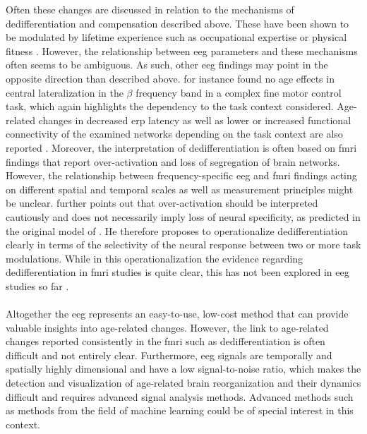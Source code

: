Often these changes are discussed in relation to the mechanisms of dedifferentiation and compensation described above. These have been shown to be modulated by lifetime experience such as occupational expertise \cite{vieluf2018age} or physical fitness \cite{Douw2014}. However, the relationship between \gls{eeg} parameters and these mechanisms often seems to be ambiguous. As such, other \gls{eeg} findings may point in the opposite direction than described above. \citeauthor{HUBNER2018104} \cite{HUBNER2018104} for instance found no age effects in central lateralization in the $\beta$ frequency band in a complex fine motor control task, which again highlights the dependency to the task context considered. Age-related changes in decreased \gls{erp} latency as well as lower or increased functional connectivity of the examined networks depending on the task context are also reported \cite{Courtney2021}. Moreover, the interpretation of dedifferentiation is often based on \gls{fmri} findings that report over-activation and loss of segregation of brain networks. However, the relationship between frequency-specific \gls{eeg} and \gls{fmri} findings acting on different spatial and temporal scales as well as measurement principles might be unclear. \citeauthor{Koen2019} \cite{Koen2019} further points out that over-activation should be interpreted cautiously and does not necessarily imply loss of neural specificity, as predicted in the original model of \citeauthor{Li2000} \cite{Li2000}. He therefore proposes to operationalize dedifferentiation clearly in terms of the selectivity of the neural response between two or more task modulations. While in this operationalization the evidence regarding dedifferentiation in \gls{fmri} studies is quite clear, this has not been explored in \gls{eeg} studies so far \cite{Koen2019}.\\
\\
Altogether the \gls{eeg} represents an easy-to-use, low-cost method that can provide valuable insights into age-related changes. However, the link to age-related changes reported consistently in the \gls{fmri} such as dedifferentiation is often difficult and not entirely clear. Furthermore, \gls{eeg} signals are temporally and spatially highly dimensional and have a low signal-to-noise ratio, which makes the detection and visualization of age-related brain reorganization and their dynamics difficult and requires advanced signal analysis methods. Advanced methods such as methods from the field of machine learning could be of special interest in this context.